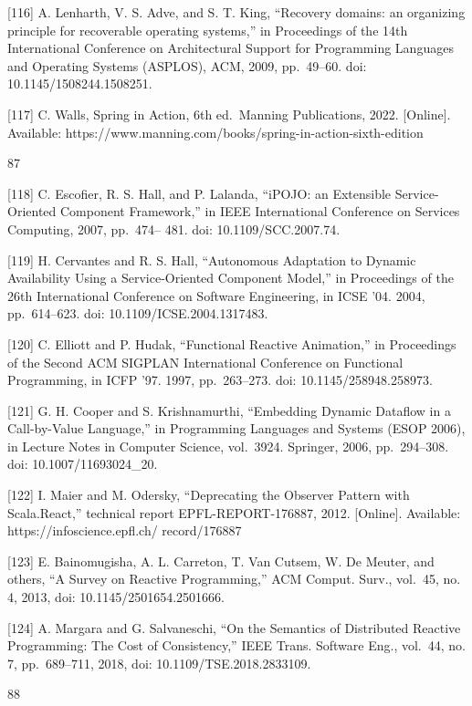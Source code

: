 \documentclass[
  10
]{article}
\begin{document}
{[}116{]} A. Lenharth, V. S. Adve, and S. T. King, ``Recovery domains:
an organizing principle for recoverable operating systems,'' in
Proceedings of the 14th International Conference on Architectural
Support for Programming Languages and Operating Systems (ASPLOS), ACM,
2009, pp.~49--60. doi: 10.1145/1508244.1508251.

{[}117{]} C. Walls, Spring in Action, 6th ed.~Manning Publications,
2022. {[}Online{]}. Available:
https://www.manning.com/books/spring-in-action-sixth-edition

87

{[}118{]} C. Escofier, R. S. Hall, and P. Lalanda, ``iPOJO: an
Extensible Service-Oriented Component Framework,'' in IEEE International
Conference on Services Computing, 2007, pp.~474-- 481. doi:
10.1109/SCC.2007.74.

{[}119{]} H. Cervantes and R. S. Hall, ``Autonomous Adaptation to
Dynamic Availability Using a Service-Oriented Component Model,'' in
Proceedings of the 26th International Conference on Software
Engineering, in ICSE '04. 2004, pp.~614--623. doi:
10.1109/ICSE.2004.1317483.

{[}120{]} C. Elliott and P. Hudak, ``Functional Reactive Animation,'' in
Proceedings of the Second ACM SIGPLAN International Conference on
Functional Programming, in ICFP '97. 1997, pp.~263--273. doi:
10.1145/258948.258973.

{[}121{]} G. H. Cooper and S. Krishnamurthi, ``Embedding Dynamic
Dataflow in a Call-by-Value Language,'' in Programming Languages and
Systems (ESOP 2006), in Lecture Notes in Computer Science, vol.~3924.
Springer, 2006, pp.~294--308. doi: 10.1007/11693024\_20.

{[}122{]} I. Maier and M. Odersky, ``Deprecating the Observer Pattern
with Scala.React,'' technical report EPFL-REPORT-176887, 2012.
{[}Online{]}. Available: https://infoscience.epfl.ch/ record/176887

{[}123{]} E. Bainomugisha, A. L. Carreton, T. Van Cutsem, W. De Meuter,
and others, ``A Survey on Reactive Programming,'' ACM Comput. Surv.,
vol.~45, no. 4, 2013, doi: 10.1145/2501654.2501666.

{[}124{]} A. Margara and G. Salvaneschi, ``On the Semantics of
Distributed Reactive Programming: The Cost of Consistency,'' IEEE Trans.
Software Eng., vol.~44, no. 7, pp.~689--711, 2018, doi:
10.1109/TSE.2018.2833109.

88
\end{document}
